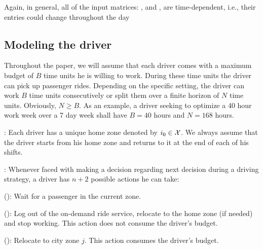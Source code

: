 Again, in general, all of the input matrices: %
{\empiricaltransitionmatrix}, {\traveltimematrix} and {\rewardsmatrix}, 
are time-dependent, i.e., their entries could change throughout the day


\subsection{Modeling the driver}
Throughout the paper, we will assume that 
each driver comes with a 
maximum budget of $B$ time units
he is willing to work. During these time units the driver 
 can pick
up passenger rides. Depending on the specific setting, the driver can
work $B$ time units consecutively or split them 
over a finite horizon of $N$ time units. Obviously, $N \geq B$. 
As an example, a driver seeking to optimize a 40 hour work week over
a 7 day week shall have $B=40$ hours and $N=168$ hours.


: 
Each driver has a unique home zone denoted by $i_0 \in \mathcal{X}$. 
We always assume that the driver starts from his home zone and returns to it
at the end of each of his shifts.

: 
Whenever faced with making a decision regarding next decision during a driving strategy, a driver has $n+2$ possible actions he can take: 
\squishlist
	\item {\getpassenger} (\getpassengeraction): Wait for a passenger in the current zone. 
	\item {\gohome} (\gohomeaction): Log out of the on-demand ride service, relocate to the home zone (if needed) 
  and stop working.   This action does not consume the driver's budget.
	\item {\relocate} (\relocateaction): Relocate to city zone $j$.  This action consumes the driver's budget.
\squishend

